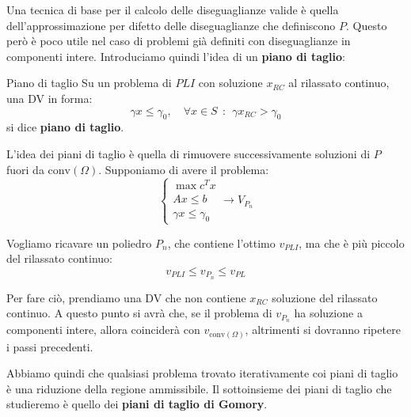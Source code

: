 \documentclass[a4paper,11pt]{article}
\begin{document}
Una tecnica di base per il calcolo delle diseguaglianze valide è quella dell'approssimazione per difetto delle diseguaglianze che definiscono $P$.
Questo però è poco utile nel caso di problemi già definiti con diseguaglianze in componenti intere.
Introduciamo quindi l'idea di un \textbf{piano di taglio}:

\begin{definition}{Piano di taglio}	
Su un problema di $PLI$ con soluzione $x_{RC}$ al rilassato continuo, una DV in forma:
$$ \gamma x \leq \gamma_0, \quad \forall x \in S \ \ : \ \ \gamma x_{RC} > \gamma_0 $$
si dice \textbf{piano di taglio}.
\end{definition}

L'idea dei piani di taglio è quella di rimuovere successivamente soluzioni di $P$ fuori da $\mathrm{conv}(\Omega)$.
Supponiamo di avere il problema:
\[
	\begin{cases}			
		\max c^T x \\ 
		Ax \leq b \\ 
		\gamma x \leq \gamma_0
	\end{cases}
	\rightarrow V_{P_{n}}
\]

Vogliamo ricavare un poliedro $P_n$, che contiene l'ottimo $v_{PLI}$, ma che è più piccolo del rilassato continuo:
$$
v_{PLI} \leq v_{P_n} \leq v_{PL}
$$

Per fare ciò, prendiamo una DV che non contiene $x_{RC}$ soluzione del rilassato continuo. 
A questo punto si avrà che, se il problema di $v_{P_n}$ ha soluzione a componenti intere, allora coinciderà con $v_{\mathrm{conv}(\Omega)}$, altrimenti si dovranno ripetere i passi precedenti.

Abbiamo quindi che qualsiasi problema trovato iterativamente coi piani di taglio è una riduzione della regione ammissibile.
Il sottoinsieme dei piani di taglio che studieremo è quello dei \textbf{piani di taglio di Gomory}.
\end{document}
